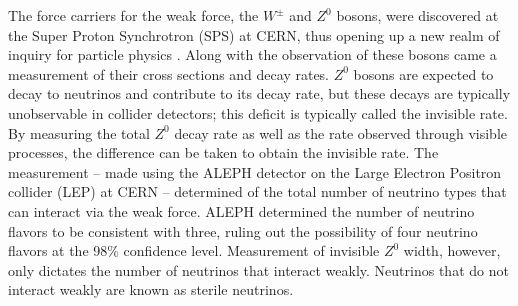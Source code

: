 The force carriers for the weak force, the $W^\pm$ and $Z^0$ bosons, were discovered at the Super Proton Synchrotron (SPS) at CERN, thus opening up a new realm of inquiry for particle physics \cite{wBoson, zBoson}.  Along with the observation of these bosons came a measurement of their cross sections and decay rates.  $Z^0$ bosons are expected to decay to neutrinos and contribute to its decay rate, but these decays are typically unobservable in collider detectors; this deficit is typically called the invisible rate.  By measuring the total $Z^0$ decay rate as well as the rate observed through visible processes, the difference can be taken to obtain the invisible rate.  The measurement -- made using the ALEPH detector on the Large Electron Positron collider (LEP) at CERN -- determined of the total number of neutrino types that can interact via the weak force.  ALEPH determined the number of neutrino flavors to be consistent with three, ruling out the possibility of four neutrino flavors at the 98\% confidence level.  \cite{aleph}  Measurement of invisible $Z^0$ width, however, only dictates the number of neutrinos that interact weakly.  Neutrinos that do not interact weakly are known as sterile neutrinos.

